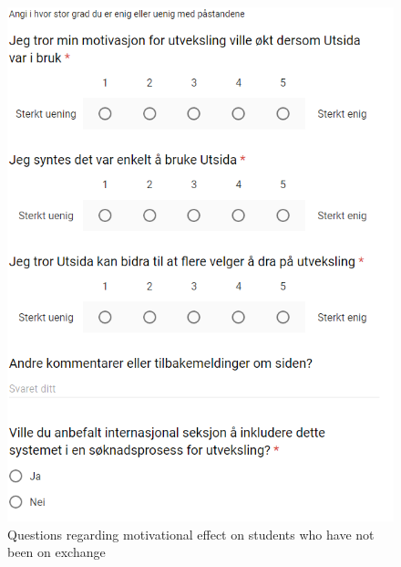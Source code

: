 \begin{figure}[h]
    \centering
    \includegraphics[width=1\textwidth]{fig/form2/s3.PNG}
    \caption[]{Questions regarding motivational effect on students who have not been on exchange}
    \label{fig:questionnaire_2_questions_p3}
\end{figure}
